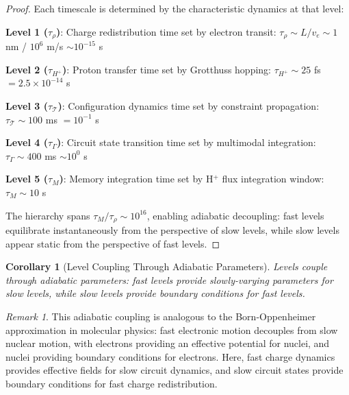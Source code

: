 \documentclass[aps,prd,twocolumn,superscriptaddress,floatfix,nofootinbib]{revtex4-2}
\newtheorem{corollary}[theorem]{Corollary}
\theoremstyle{remark}
\newtheorem{remark}[theorem]{Remark}
\begin{document}
\begin{proof}
Each timescale is determined by the characteristic dynamics at that level:

\textbf{Level 1 ($\tau_{\rho}$)}: Charge redistribution time set by electron transit: $\tau_{\rho} \sim L/v_e \sim 1$ nm / $10^6$ m/s $\sim 10^{-15}$ s

\textbf{Level 2 ($\tau_{H^+}$)}: Proton transfer time set by Grotthuss hopping: $\tau_{H^+} \sim 25$ fs $= 2.5 \times 10^{-14}$ s

\textbf{Level 3 ($\tau_{\mathcal{T}}$)}: Configuration dynamics time set by constraint propagation: $\tau_{\mathcal{T}} \sim 100$ ms $= 10^{-1}$ s

\textbf{Level 4 ($\tau_{\Gamma}$)}: Circuit state transition time set by multimodal integration: $\tau_{\Gamma} \sim 400$ ms $\sim 10^{0}$ s

\textbf{Level 5 ($\tau_{M}$)}: Memory integration time set by H$^+$ flux integration window: $\tau_{M} \sim 10$ s

The hierarchy spans $\tau_{M} / \tau_{\rho} \sim 10^{16}$, enabling adiabatic decoupling: fast levels equilibrate instantaneously from the perspective of slow levels, while slow levels appear static from the perspective of fast levels.
\end{proof}

\begin{corollary}[Level Coupling Through Adiabatic Parameters]
\label{cor:adiabatic_coupling}
Levels couple through adiabatic parameters: fast levels provide slowly-varying parameters for slow levels, while slow levels provide boundary conditions for fast levels.
\end{corollary}

\begin{remark}
This adiabatic coupling is analogous to the Born-Oppenheimer approximation in molecular physics: fast electronic motion decouples from slow nuclear motion, with electrons providing an effective potential for nuclei, and nuclei providing boundary conditions for electrons. Here, fast charge dynamics provides effective fields for slow circuit dynamics, and slow circuit states provide boundary conditions for fast charge redistribution.
\end{remark}
\end{document}
